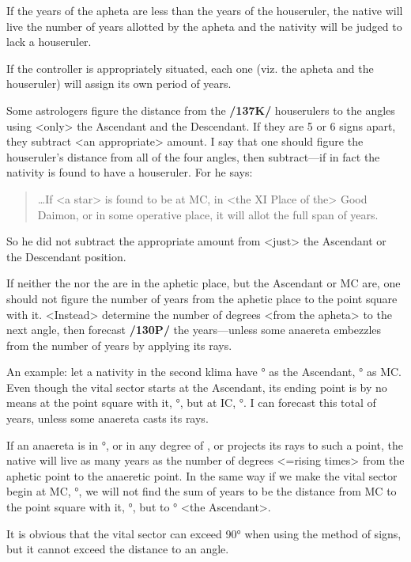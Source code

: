 If the years of the apheta are less than the years of the houseruler, the native will live the number of years allotted by the apheta and the nativity will be judged to lack a houseruler. 

If the controller is appropriately situated, each one (viz. the apheta and the houseruler) will assign its own period of years.

Some astrologers figure the distance from the \textbf{/137K/} houserulers to the angles using <only> the Ascendant and the Descendant. If they are 5 or 6 signs apart, they subtract <an appropriate> amount. I say that one should figure the houseruler’s distance from all of the four angles, then subtract—if in fact the nativity is found to have a houseruler. For he says: 
\begin{quote}\ldots If <a star> is found to be at MC, in <the XI Place of the> Good Daimon, or in some operative place, it will allot the full span of years.
\end{quote}

So he did not subtract the appropriate amount from <just> the Ascendant or the Descendant position. 

If neither the \Sun\xspace nor the \Moon\xspace are in the aphetic place, but the Ascendant or MC are, one should not figure the number of years from the aphetic place to the point square with it. <Instead> determine the number of degrees <from the apheta> to the next angle, then forecast \textbf{/130P/} the years—unless some anaereta embezzles from the number of years by applying its rays.

An example: let a nativity in the second klima have \Gemini\xspace 8° as the Ascendant, \Aquarius\xspace 22° as
MC. Even though the vital sector starts at the Ascendant, its ending point is by no means at the point square with it, \Virgo\xspace 8°, but at IC, \Leo\xspace 22°. I can forecast this total of years, unless some anaereta casts its rays. 

If an anaereta is in \Gemini\xspace 20°, or in any degree of \Cancer, or projects its rays to such a point, the native will live as many years as the number of degrees <=rising times> from the aphetic point to the anaeretic point. In the same way if we make the vital sector begin at MC, \Aquarius\xspace 22°, we will not find the sum of years to be the distance from MC to the point square with it, \Taurus\xspace 22°, but to \Gemini\xspace 8° <the Ascendant>. 

It is obvious that the vital sector can exceed 90° when using the method of signs, but it cannot exceed the distance to an angle.


